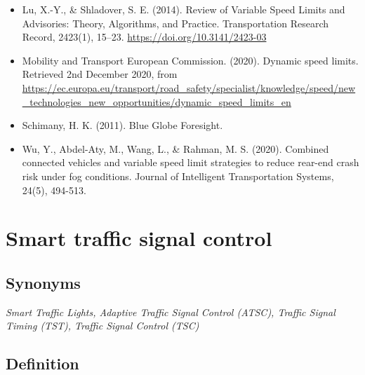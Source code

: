 \documentclass[
]{book}
\begin{document}
\begin{itemize}
\item
  Lu, X.-Y., \& Shladover, S. E. (2014). Review of Variable Speed Limits and Advisories: Theory, Algorithms, and Practice. Transportation Research Record, 2423(1), 15--23. \url{https://doi.org/10.3141/2423-03}
\item
  Mobility and Transport \textbar{} European Commission. (2020). Dynamic speed limits. Retrieved 2nd December 2020, from \url{https://ec.europa.eu/transport/road_safety/specialist/knowledge/speed/new_technologies_new_opportunities/dynamic_speed_limits_en}
\item
  Schimany, H. K. (2011). Blue Globe Foresight.
\item
  Wu, Y., Abdel-Aty, M., Wang, L., \& Rahman, M. S. (2020). Combined connected vehicles and variable speed limit strategies to reduce rear-end crash risk under fog conditions. Journal of Intelligent Transportation Systems, 24(5), 494-513.
\end{itemize}

\hypertarget{adaptive_traffic_control}{%
\section{Smart traffic signal control}\label{adaptive_traffic_control}}

\hypertarget{synonyms-10}{%
\subsection*{Synonyms}\label{synonyms-10}}

\emph{Smart Traffic Lights, Adaptive Traffic Signal Control (ATSC), Traffic Signal Timing (TST), Traffic Signal Control (TSC)}

\hypertarget{definition-11}{%
\subsection*{Definition}\label{definition-11}}
\end{document}
